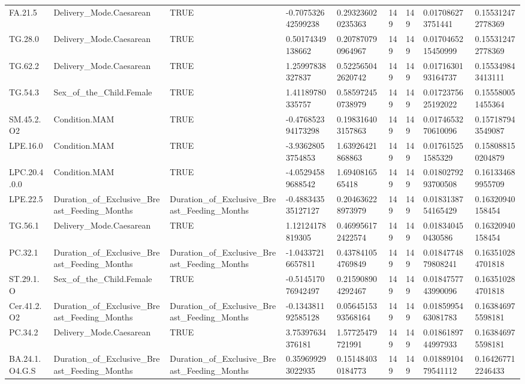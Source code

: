 \begin{longtable}{lllllllll}
FA.21.5 & Delivery\_Mode.Caesarean & TRUE & -0.707532642599238 & 0.293236020235363 & 149 & 149 & 0.017086273751441 & 0.155312472778369 \\
TG.28.0 & Delivery\_Mode.Caesarean & TRUE & 0.50174349138662 & 0.207870790964967 & 149 & 149 & 0.0170465215450999 & 0.155312472778369 \\
TG.62.2 & Delivery\_Mode.Caesarean & TRUE & 1.25997838327837 & 0.522565042620742 & 149 & 149 & 0.0171630193164737 & 0.155349843413111 \\
TG.54.3 & Sex\_of\_the\_Child.Female & TRUE & 1.41189780335757 & 0.585972450738979 & 149 & 149 & 0.0172375625192022 & 0.155580051455364 \\
SM.45.2.O2 & Condition.MAM & TRUE & -0.476852394173298 & 0.198316403157863 & 149 & 149 & 0.0174653270610096 & 0.157187943549087 \\
LPE.16.0 & Condition.MAM & TRUE & -3.93628053754853 & 1.63926421868863 & 149 & 149 & 0.017615251585329 & 0.158088150204879 \\
LPC.20.4.0.0 & Condition.MAM & TRUE & -4.05294589688542 & 1.6940816565418 & 149 & 149 & 0.0180279293700508 & 0.161334689955709 \\
LPE.22.5 & Duration\_of\_Exclusive\_Breast\_Feeding\_Months & Duration\_of\_Exclusive\_Breast\_Feeding\_Months & -0.488343535127127 & 0.204636228973979 & 149 & 149 & 0.0183138754165429 & 0.16320940158454 \\
TG.56.1 & Delivery\_Mode.Caesarean & TRUE & 1.12124178819305 & 0.469956172422574 & 149 & 149 & 0.018340450430586 & 0.16320940158454 \\
PC.32.1 & Duration\_of\_Exclusive\_Breast\_Feeding\_Months & Duration\_of\_Exclusive\_Breast\_Feeding\_Months & -1.04337216657811 & 0.437841054769849 & 149 & 149 & 0.0184774879808241 & 0.163510284701818 \\
ST.29.1.O & Sex\_of\_the\_Child.Female & TRUE & -0.514517076942497 & 0.215908904292467 & 149 & 149 & 0.0184757743990096 & 0.163510284701818 \\
Cer.41.2.O2 & Duration\_of\_Exclusive\_Breast\_Feeding\_Months & Duration\_of\_Exclusive\_Breast\_Feeding\_Months & -0.134381192585128 & 0.0564515393568164 & 149 & 149 & 0.0185995463081783 & 0.163846975598181 \\
PC.34.2 & Delivery\_Mode.Caesarean & TRUE & 3.75397634376181 & 1.57725479721991 & 149 & 149 & 0.0186189744997933 & 0.163846975598181 \\
BA.24.1.O4.G.S & Duration\_of\_Exclusive\_Breast\_Feeding\_Months & Duration\_of\_Exclusive\_Breast\_Feeding\_Months & 0.359699293022935 & 0.151484030184773 & 149 & 149 & 0.0188910479541112 & 0.164267712246433 \\

\end{longtable}
